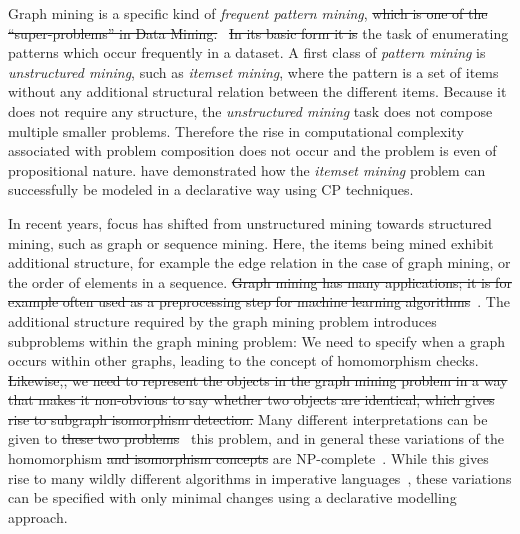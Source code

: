 

Graph mining is a specific kind of \emph{frequent pattern mining}, \st{which is one of the ``super-problems'' in Data Mining.}~\citep{?}
\st{In its basic form it is }the task of enumerating patterns which occur frequently in a dataset.
A first class of \emph{pattern mining} is \emph{unstructured mining}, such as \emph{itemset mining}, where the pattern is a set of items without any additional structural relation between the different items. 
Because it does not require any structure, the \emph{unstructured mining} task does not compose multiple smaller problems.
Therefore the rise in computational complexity associated with problem composition does not occur and the problem is even of propositional nature.
\citet{tias_original} have demonstrated how the \emph{itemset mining} problem can successfully be modeled in a declarative way using CP techniques.

In recent years, focus has shifted from unstructured mining towards structured mining, such as graph or sequence mining.
Here, the items being mined exhibit additional structure, for example the edge relation in the case of graph mining, or the order of elements in a sequence.
\st{Graph mining has many applications; it is for example often used as a preprocessing step for machine learning algorithms}~\citep{pattern_mining_classification}.
The additional structure required by the graph mining problem introduces subproblems within the graph mining problem: We need to specify when a graph occurs within other graphs, leading to the concept of homomorphism checks.
\st{Likewise,}\st{, we need to represent the objects in the graph mining problem in a way that makes it non-obvious to say whether two objects are identical, which gives rise to subgraph isomorphism detection.}
Many different interpretations can be given to \st{these two problems}~ this problem\citep{subtree_overview}, and in general these variations of the homomorphism \st{and isomorphism concepts }are NP-complete~\citep{}.
While this gives rise to many wildly different algorithms in imperative languages~\citep{gspan,theta_subsumption}, these variations can be specified with only minimal changes using a declarative modelling approach.


